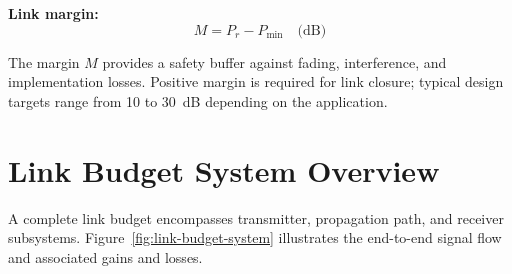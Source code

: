 \textbf{Link margin:}
\begin{equation}
M = P_r - P_{\text{min}} \quad \text{(dB)}
\label{eq:link-margin}
\end{equation}

The margin $M$ provides a safety buffer against fading, interference, and implementation losses. Positive margin is required for link closure; typical design targets range from 10 to 30~dB depending on the application.

\section{Link Budget System Overview}

A complete link budget encompasses transmitter, propagation path, and receiver subsystems. Figure~\ref{fig:link-budget-system} illustrates the end-to-end signal flow and associated gains and losses.

